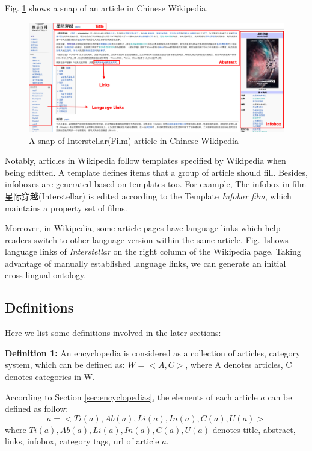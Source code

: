 \documentclass[runningheads,a4paper]{llncs}
\begin{document}
Fig. \ref{fig:interstellar} shows a snap of an article in Chinese Wikipedia.
\begin{figure}[ht]
    \centerline{\includegraphics[width=1\columnwidth]{fig/interstellar}}
    \label{fig:interstellar}
    \caption{A snap of Interstellar(Film) article in Chinese Wikipedia}
\end{figure}%

Notably, articles in Wikipedia follow templates specified by Wikipedia when being editted. A template defines items that a group of article should fill. Besides, infoboxes are generated based on templates too. For example, The infobox in film 星际穿越(Interstellar) is edited according to the Template \emph{Infobox film}, which maintains a property set of films.

Moreover, in Wikipedia, some article pages have language links which help readers switch to other language-version within the same article. Fig. \ref{fig:interstellar}shows language links of \emph{Interstellar} on the right column of the Wikipedia page. Taking advantage of manually established language links, we can generate an initial cross-lingual ontology.

\subsection{Definitions}
\label{sec:definition}
Here we list some definitions involved in the later sections:

\textbf{Definition 1:} An encyclopedia is considered as a collection of articles, category system, which can be defined as: $W = <A,C>$, where A denotes articles, C denotes categories in W.

According to Section \ref{sec:encyclopedias}, the elements of each article $a$ can be defined as follow:
\begin{equation}
    a = <Ti(a),Ab(a),Li(a),In(a),C(a),U(a)>
\end{equation}
where $Ti(a),Ab(a),Li(a),In(a),C(a),U(a)$ denotes title, abstract, links, infobox, category tags, url of article $a$.
\end{document}
